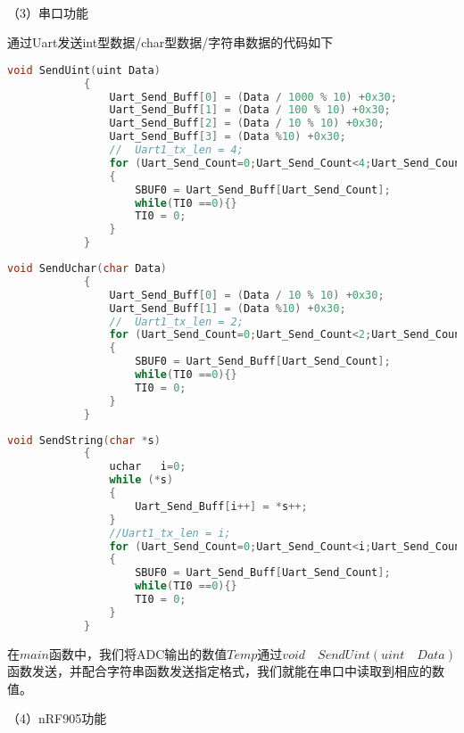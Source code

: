 \documentclass{zjureport}
\begin{document}
	     ~\\
	              
	（3）串口功能  
	            
	       通过Uart发送int型数据/char型数据/字符串数据的代码如下
	       \begin{lstlisting}[language=C]
	       	void SendUint(uint Data)
	       	{
	       		Uart_Send_Buff[0] = (Data / 1000 % 10) +0x30;
	       		Uart_Send_Buff[1] = (Data / 100 % 10) +0x30;
	       		Uart_Send_Buff[2] = (Data / 10 % 10) +0x30;
	       		Uart_Send_Buff[3] = (Data %10) +0x30;
	       		//	Uart1_tx_len = 4;
	       		for (Uart_Send_Count=0;Uart_Send_Count<4;Uart_Send_Count++)
	       		{
	       			SBUF0 = Uart_Send_Buff[Uart_Send_Count];
	       			while(TI0 ==0){}
	       			TI0 = 0;
	       		}
	       	}
	       	\end{lstlisting}
	       
	       \begin{lstlisting}[language=C]
	       	void SendUchar(char Data)
	       	{
	       		Uart_Send_Buff[0] = (Data / 10 % 10) +0x30;
	       		Uart_Send_Buff[1] = (Data %10) +0x30;
	       		//	Uart1_tx_len = 2;
	       		for (Uart_Send_Count=0;Uart_Send_Count<2;Uart_Send_Count++)
	       		{
	       			SBUF0 = Uart_Send_Buff[Uart_Send_Count];
	       			while(TI0 ==0){}
	       			TI0 = 0;
	       		}
	       	}
	       \end{lstlisting}
	       
	        \begin{lstlisting}[language=C]
	       	void SendString(char *s)
	       	{
	       		uchar	i=0;
	       		while (*s)
	       		{
	       			Uart_Send_Buff[i++] = *s++;
	       		}
	       		//Uart1_tx_len = i;
	       		for (Uart_Send_Count=0;Uart_Send_Count<i;Uart_Send_Count++)
	       		{
	       			SBUF0 = Uart_Send_Buff[Uart_Send_Count];
	       			while(TI0 ==0){}
	       			TI0 = 0;
	       		}
	       	}
	       \end{lstlisting}
	       
	       在$main$函数中，我们将ADC输出的数值$Temp$通过$void \quad SendUint(uint \quad Data)$函数发送，并配合字符串函数发送指定格式，我们就能在串口中读取到相应的数值。
	          
	         \newpage
	          	               
	（4）nRF905功能   
	
\end{document}
